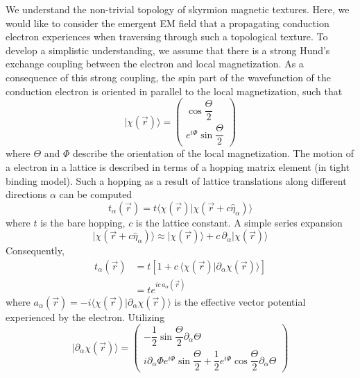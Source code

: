 \documentclass[aps,prb,onecolumn,notitlepage,showpacs,floatfix,superscriptaddress]{revtex4-1}
\begin{document}
We understand the non-trivial topology of skyrmion magnetic textures. Here, we would like to consider the emergent EM field that a propagating conduction electron experiences when traversing through such a topological texture. To develop a simplistic understanding, we assume that there is a strong Hund's exchange coupling between the electron and local magnetization. As a consequence of this strong coupling, the spin part of the wavefunction of the conduction electron is oriented in parallel to the local magnetization, such that
\begin{equation}
\vert \chi (\vec{r}) \rangle = \left( \begin{array}{c}
\cos\dfrac{\Theta}{2} \\ 
e^{i\Phi} \sin\dfrac{\Theta}{2}
\end{array} \right)
\end{equation}
where $\Theta$ and $\Phi$ describe the orientation of the local magnetization. The motion of a electron in a lattice is described in terms of a hopping matrix element (in tight binding model). Such a hopping as a result of lattice translations along different directions $\alpha$ can be computed
\begin{equation}
t_\alpha (\vec{r}) = t \langle \chi(\vec{r}) \vert \chi(\vec{r}+c\hat{\eta}_\alpha) \rangle
\end{equation}
where $t$ is the bare hopping, $c$ is the lattice constant. A simple series expansion
\begin{equation}
\vert \chi(\vec{r}+c\hat{\eta}_\alpha) \rangle \approx \vert \chi(\vec{r}) \rangle + c \, \partial_\alpha \vert \chi(\vec{r}) \rangle
\end{equation}
Consequently,
\begin{equation}
\begin{split}
t_\alpha (\vec{r}) &= t [1 + c \, \langle \chi(\vec{r}) \vert \partial_\alpha \chi(\vec{r}) \rangle] \\
&= t e^{ic\, a_{\alpha} (\vec{r})}
\end{split}
\end{equation}
where $a_{\alpha} (\vec{r}) = -i\langle \chi(\vec{r}) \vert \partial_\alpha \chi(\vec{r}) \rangle$ is the effective vector potential experienced by the electron. Utilizing
\begin{equation}
\vert \partial_\alpha \chi (\vec{r}) \rangle = \left( \begin{array}{c}
-\dfrac{1}{2}\sin\dfrac{\Theta}{2} \partial_\alpha\Theta \\ 
i \partial_\alpha \Phi e^{i\Phi} \sin\dfrac{\Theta}{2} + \dfrac{1}{2}e^{i\Phi}\cos\dfrac{\Theta}{2} \partial_\alpha\Theta 
\end{array} \right)
\end{equation}
\end{document}
